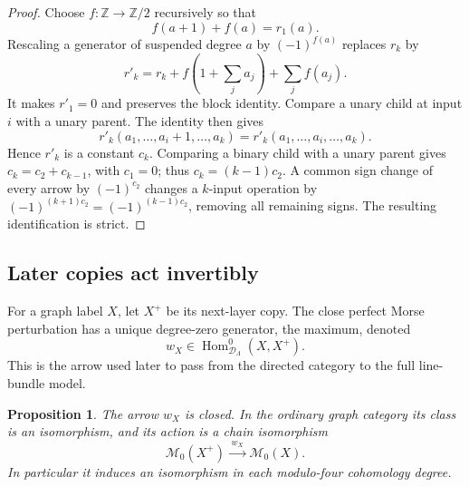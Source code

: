 \documentclass[11pt]{article}
\newtheorem{proposition}[theorem]{Proposition}
\theoremstyle{definition}
\theoremstyle{remark}
\newcommand{\Z}{\mathbb Z}
\DeclareMathOperator{\Hom}{Hom}
\numberwithin{equation}{section}
\begin{document}
\begin{proof}
Choose \(f:\Z\to\Z/2\) recursively so that
\[
 f(a+1)+f(a)=r_1(a).
\]
Rescaling a generator of suspended degree \(a\) by \((-1)^{f(a)}\)
replaces \(r_k\) by
\[
 r'_k=r_k+f(1+\textstyle\sum_j a_j)+\sum_j f(a_j).
\]
It makes \(r'_1=0\) and preserves the block identity.
Compare a unary child at input \(i\) with a unary parent.  The identity
then gives
\[
 r'_k(a_1,\ldots,a_i+1,\ldots,a_k)
     =r'_k(a_1,\ldots,a_i,\ldots,a_k).
\]
Hence \(r'_k\) is a constant \(c_k\).  Comparing a binary child with a
unary parent gives \(c_k=c_2+c_{k-1}\), with \(c_1=0\); thus
\(c_k=(k-1)c_2\).  A common sign change of every arrow by
\((-1)^{c_2}\) changes a \(k\)-input operation by
\((-1)^{(k+1)c_2}=(-1)^{(k-1)c_2}\), removing all remaining signs.
The resulting identification is strict.
\end{proof}

\subsection{Later copies act invertibly}

For a graph label \(X\), let \(X^+\) be its next-layer copy.
The close perfect Morse perturbation has a unique degree-zero
generator, the maximum, denoted
\[
 w_X\in\Hom_{\mathcal D_\Lambda}^0(X,X^+).
\]
This is the arrow used later to pass from the directed category to
the full line-bundle model.

\begin{proposition}\label{cat:continuation}
The arrow \(w_X\) is closed.  In the ordinary graph category its class is
an isomorphism, and its action is a chain isomorphism
\[
 \mathcal M_0(X^+)\xrightarrow{\;w_X\;}\mathcal M_0(X).
\]
In particular it induces an isomorphism in each modulo-four cohomology
degree.
\end{proposition}
\end{document}
